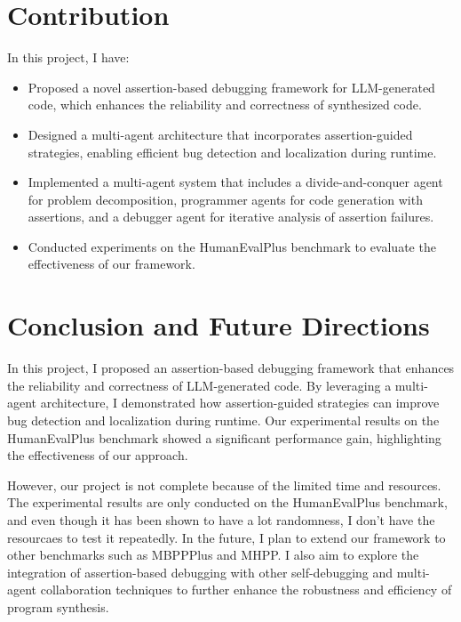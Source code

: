 
\section{Contribution}

In this project, I have:

\begin{itemize}
    \item Proposed a novel assertion-based debugging framework for LLM-generated code, which enhances the reliability and correctness of synthesized code.
    \item Designed a multi-agent architecture that incorporates assertion-guided strategies, enabling efficient bug detection and localization during runtime.
    \item Implemented a multi-agent system that includes a divide-and-conquer agent for problem decomposition, programmer agents for code generation with assertions, and a debugger agent for iterative analysis of assertion failures.
    \item Conducted experiments on the HumanEvalPlus benchmark to evaluate the effectiveness of our framework.
\end{itemize}

\section{Conclusion and Future Directions}


In this project, I proposed an assertion-based debugging framework that enhances the reliability and correctness of LLM-generated code. By leveraging a multi-agent architecture, I demonstrated how assertion-guided strategies can improve bug detection and localization during runtime. Our experimental results on the HumanEvalPlus benchmark showed a significant performance gain, highlighting the effectiveness of our approach.

However, our project is not complete because of the limited time and resources. The experimental results are only conducted on the HumanEvalPlus benchmark, and even though it has been shown to have a lot randomness, I don't have the resourcaes to test it repeatedly. In the future, I plan to extend our framework to other benchmarks such as MBPPPlus\cite{evalplus} and MHPP\cite{MHPP}. I also aim to explore the integration of assertion-based debugging with other self-debugging and multi-agent collaboration techniques to further enhance the robustness and efficiency of program synthesis.

